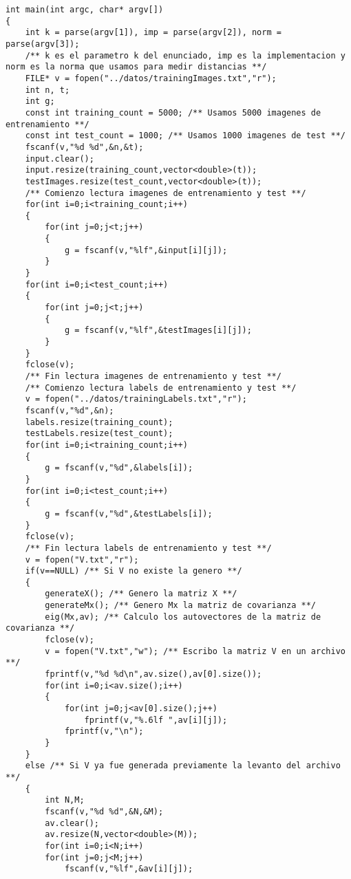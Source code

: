 \begin{lstlisting}
int main(int argc, char* argv[])
{
    int k = parse(argv[1]), imp = parse(argv[2]), norm = parse(argv[3]);
    /** k es el parametro k del enunciado, imp es la implementacion y norm es la norma que usamos para medir distancias **/
	FILE* v = fopen("../datos/trainingImages.txt","r");
	int n, t;
    int g;
    const int training_count = 5000; /** Usamos 5000 imagenes de entrenamiento **/
    const int test_count = 1000; /** Usamos 1000 imagenes de test **/
	fscanf(v,"%d %d",&n,&t);
	input.clear();
	input.resize(training_count,vector<double>(t));
	testImages.resize(test_count,vector<double>(t));
	/** Comienzo lectura imagenes de entrenamiento y test **/
	for(int i=0;i<training_count;i++)
    {
        for(int j=0;j<t;j++)
        {
            g = fscanf(v,"%lf",&input[i][j]);
        }
    }
    for(int i=0;i<test_count;i++)
    {
		for(int j=0;j<t;j++)
		{
			g = fscanf(v,"%lf",&testImages[i][j]);
		}
	}
	fclose(v);
	/** Fin lectura imagenes de entrenamiento y test **/
	/** Comienzo lectura labels de entrenamiento y test **/
    v = fopen("../datos/trainingLabels.txt","r");
    fscanf(v,"%d",&n);
    labels.resize(training_count);
    testLabels.resize(test_count);
    for(int i=0;i<training_count;i++)
    {
        g = fscanf(v,"%d",&labels[i]);
    }
    for(int i=0;i<test_count;i++)
    {
		g = fscanf(v,"%d",&testLabels[i]);
	}
	fclose(v);
	/** Fin lectura labels de entrenamiento y test **/
	v = fopen("V.txt","r");
	if(v==NULL) /** Si V no existe la genero **/
	{
        generateX(); /** Genero la matriz X **/
        generateMx(); /** Genero Mx la matriz de covarianza **/
        eig(Mx,av); /** Calculo los autovectores de la matriz de covarianza **/
        fclose(v);
        v = fopen("V.txt","w"); /** Escribo la matriz V en un archivo **/
        fprintf(v,"%d %d\n",av.size(),av[0].size());
        for(int i=0;i<av.size();i++)
        {
            for(int j=0;j<av[0].size();j++)
                fprintf(v,"%.6lf ",av[i][j]);
            fprintf(v,"\n");
        }
	}
	else /** Si V ya fue generada previamente la levanto del archivo **/
	{
	    int N,M;
	    fscanf(v,"%d %d",&N,&M);
	    av.clear();
	    av.resize(N,vector<double>(M));
	    for(int i=0;i<N;i++)
	    for(int j=0;j<M;j++)
            fscanf(v,"%lf",&av[i][j]);


\end{lstlisting}
